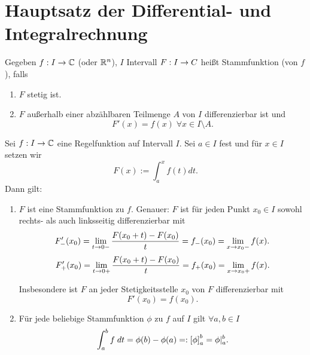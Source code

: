 \documentclass[../ana2.tex]{subfiles}
\begin{document}
\setcounter{section}{4}
\section{Hauptsatz der Differential- und Integralrechnung}

\begin{defi}
    Gegeben \( \abb{f}{I}{\C} \) (oder \( \R^n \)), 
    \(I\) Intervall    
    \( \abb{F}{I}{C} \) heißt Stammfunktion (von \(f\)), falls
    \begin{enumerate}
        \item \(F\) stetig ist.
        \item \(F\) außerhalb einer abzählbaren Teilmenge 
        \( A \) von \( I \) differenzierbar ist und 
        \[ F'(x) = f(x) \; \forall x\in I \setminus A. \]
    \end{enumerate}   
\end{defi} 
\begin{satz}
    Sei \( \abb{f}{I}{\C} \) eine Regelfunktion 
    auf Intervall \(I\). Sei \(a \in I\) fest und 
    für \( x\in I \) setzen wir 
    \[ F(x) := \int_a^x f(t) dt. \]
    Dann gilt: 
    \begin{enumerate}
        \item \(F\) ist eine Stammfunktion zu \(f\).
        Genauer: \( F \) ist für jeden Punkt 
        \( x_0 \in I \) sowohl rechts- als auch linksseitig 
        differenzierbar mit 
        \[ F'_-(x_0) = \limesx{t}{0-} 
        \frac{F(x_0 + t) - F(x_0)}{t} 
        = f_-(x_0) = \limesx{x}{x_0-} f(x). \]
        \[ F'_+(x_0) = \limesx{t}{0+} 
        \frac{F(x_0 + t) - F(x_0)}{t} 
        = f_+(x_0) = \limesx{x}{x_0+} f(x). \]
        
        Insbesondere ist \(F\) an jeder Stetigkeitsstelle 
        \( x_0 \) von \(F\) differenzierbar mit 
        \[ F'(x_0) = f(x_0). \]
        \item Für jede beliebige Stammfunktion \(\phi \) 
        zu \(f\) auf \(I\) gilt \( \forall a,b \in I \)
        \[ \integralx{f}{a}{b}{t} = \phi(b)-\phi(a) 
        =: \left[ \phi \right]^b_a = \phi \vert_a^b. \]
    \end{enumerate}
\end{satz}
\end{document}
